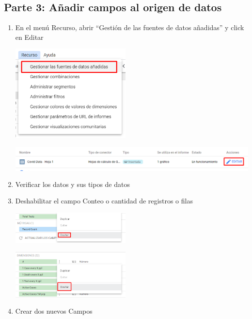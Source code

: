 \documentclass[12pt,letterpaper]{article}
\newcommand\tab[1][1cm]{\hspace*{#1}}
\begin{document}
    \subsection{Parte 3: Añadir campos al origen de datos}
    \begin{enumerate}[\tab 1.]
        \item En el menú Recurso, abrir “Gestión de las fuentes de datos añadidas” y click en Editar
        \begin{center}
            \includegraphics[width=6cm]{./img/img8.png}
        \end{center}
        \begin{center}
            \includegraphics[width=13cm]{./img/img9.png}
        \end{center}
        \item Verificar los datos y sus tipos de datos
        \item Deshabilitar el campo Conteo o cantidad de registros o filas
        \begin{center}
            \includegraphics[width=6cm]{./img/img10.png}
        \end{center}
        \begin{center}
            \includegraphics[width=6cm]{./img/img11.png}
        \end{center}
        \item Crear dos nuevos Campos

\end{enumerate}
\end{document}
